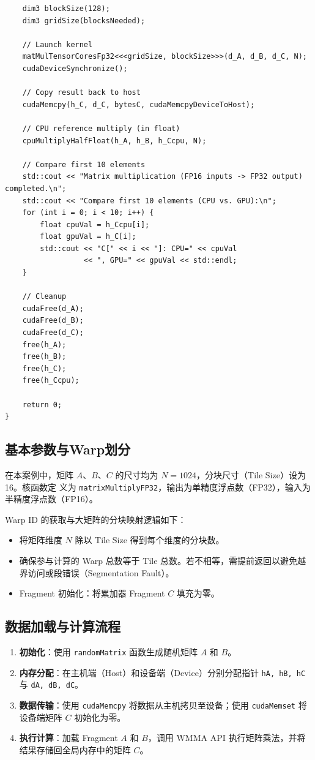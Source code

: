 \begin{lstlisting}
    dim3 blockSize(128);
    dim3 gridSize(blocksNeeded);

    // Launch kernel
    matMulTensorCoresFp32<<<gridSize, blockSize>>>(d_A, d_B, d_C, N);
    cudaDeviceSynchronize();

    // Copy result back to host
    cudaMemcpy(h_C, d_C, bytesC, cudaMemcpyDeviceToHost);

    // CPU reference multiply (in float)
    cpuMultiplyHalfFloat(h_A, h_B, h_Ccpu, N);

    // Compare first 10 elements
    std::cout << "Matrix multiplication (FP16 inputs -> FP32 output) completed.\n";
    std::cout << "Compare first 10 elements (CPU vs. GPU):\n";
    for (int i = 0; i < 10; i++) {
        float cpuVal = h_Ccpu[i];
        float gpuVal = h_C[i];
        std::cout << "C[" << i << "]: CPU=" << cpuVal
                  << ", GPU=" << gpuVal << std::endl;
    }

    // Cleanup
    cudaFree(d_A);
    cudaFree(d_B);
    cudaFree(d_C);
    free(h_A);
    free(h_B);
    free(h_C);
    free(h_Ccpu);

    return 0;
}

\end{lstlisting}

\subsection{基本参数与Warp划分}
在本案例中，矩阵 $A$、$B$、$C$ 的尺寸均为 $N=1024$，分块尺寸（Tile Size）设为16。核函数定
义为 \texttt{matrixMultiplyFP32}，输出为单精度浮点数（FP32），输入为半精度浮点数（FP16）。

Warp ID 的获取与大矩阵的分块映射逻辑如下：
\begin{itemize}
    \item 将矩阵维度 $N$ 除以 Tile Size 得到每个维度的分块数。
    \item 确保参与计算的 Warp 总数等于 Tile 总数。若不相等，需提前返回以避免越界访问或段错误（Segmentation Fault）。
    \item Fragment 初始化：将累加器 Fragment $C$ 填充为零。
\end{itemize}

\subsection{数据加载与计算流程}
\begin{enumerate}
    \item \textbf{初始化}：使用 \texttt{randomMatrix} 函数生成随机矩阵 $A$ 和 $B$。
    \item \textbf{内存分配}：在主机端（Host）和设备端（Device）分别分配指针 \texttt{hA, hB, hC} 与 \texttt{dA, dB, dC}。
    \item \textbf{数据传输}：使用 \texttt{cudaMemcpy} 将数据从主机拷贝至设备；使用 \texttt{cudaMemset} 将设备端矩阵 $C$ 初始化为零。
    \item \textbf{执行计算}：加载 Fragment $A$ 和 $B$，调用 WMMA API 执行矩阵乘法，并将结果存储回全局内存中的矩阵 $C$。
\end{enumerate}

